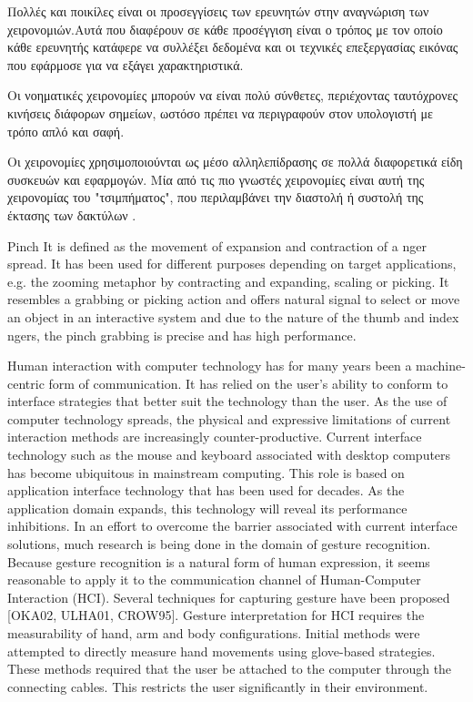 Πολλές και ποικίλες είναι οι προσεγγίσεις των ερευνητών στην αναγνώριση των χειρονομιών.Αυτά που διαφέρουν σε κάθε προσέγγιση είναι ο τρόπος με τον οποίο κάθε ερευνητής κατάφερε να συλλέξει δεδομένα και οι τεχνικές επεξεργασίας εικόνας που εφάρμοσε για να εξάγει χαρακτηριστικά.

Οι νοηματικές χειρονομίες μπορούν να είναι πολύ σύνθετες, περιέχοντας ταυτόχρονες κινήσεις διάφορων σημείων, ωστόσο πρέπει να περιγραφούν στον υπολογιστή με τρόπο απλό και σαφή.

Οι χειρονομίες χρησιμοποιούνται ως μέσο αλληλεπίδρασης σε πολλά διαφορετικά είδη συσκευών και εφαρμογών. Μία από τις πιο γνωστές χειρονομίες είναι αυτή της χειρονομίας του "τσιμπήματος", που περιλαμβάνει την διαστολή ή συστολή της έκτασης των δακτύλων \cite{hoggan2013multi}.


Pinch It is defined as the movement of expansion and contraction of a nger spread. It has been used for different purposes depending on target applications, e.g. the zooming metaphor by contracting and expanding, scaling or picking. It resembles a grabbing or picking action and offers natural signal to select or move an object in an interactive system and due to the nature of the thumb and index ngers, the pinch grabbing is precise and has high performance.


Human interaction with computer technology has for many years been a machine-centric form of communication. It has relied on the user’s ability to conform to interface strategies that better suit the technology than the user. As the use of computer technology spreads, the physical and expressive limitations of current interaction methods are increasingly counter-productive. Current interface technology such as the mouse and keyboard associated with desktop computers has become ubiquitous in mainstream computing. This role is based on application interface technology that has been used for decades. As the application domain expands, this technology will reveal its performance inhibitions. In an effort to overcome the barrier associated with current interface solutions, much research is being done in the domain of gesture recognition. Because gesture recognition is a natural form of human expression, it seems reasonable to apply it to the communication channel of Human-Computer Interaction (HCI). Several techniques for capturing gesture have been proposed [OKA02, ULHA01, CROW95]. Gesture interpretation for HCI requires the measurability of hand, arm and body configurations. Initial methods were attempted to directly measure hand movements using glove-based strategies. These methods required that the user be attached to the computer through the connecting cables. This restricts the user significantly in their environment.

